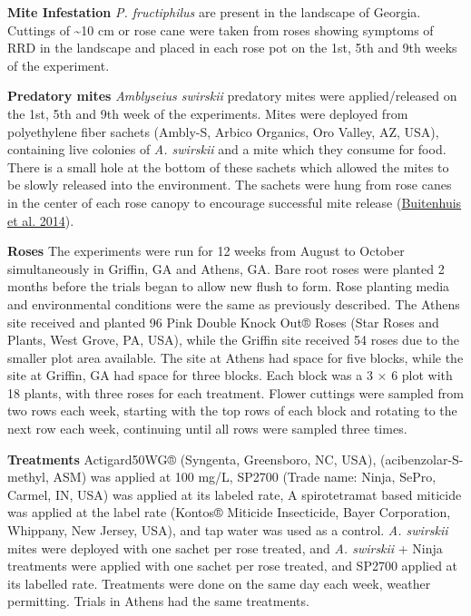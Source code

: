 \documentclass[12pt,final,CPage]{ufthesis}
\begin{document}
{  \textbf{Mite Infestation}
  \emph{P. fructiphilus} are present in the landscape of Georgia. Cuttings of \textasciitilde10 cm or rose cane were taken from roses showing symptoms of RRD in the landscape and placed in each rose pot on the 1st, 5th and 9th weeks of the experiment.

  \textbf{Predatory mites}
  \emph{Amblyseius swirskii} predatory mites were applied/released on the 1st, 5th and 9th week of the experiments. Mites were deployed from polyethylene fiber sachets (Ambly-S, Arbico Organics, Oro Valley, AZ, USA), containing live colonies of \emph{A. swirskii} and a mite which they consume for food. There is a small hole at the bottom of these sachets which allowed the mites to be slowly released into the environment. The sachets were hung from rose canes in the center of each rose canopy to encourage successful mite release (\protect\hyperlink{ref-Buitenhuis2014}{Buitenhuis et al. 2014}).

  \textbf{Roses}
  The experiments were run for 12 weeks from August to October simultaneously in Griffin, GA and Athens, GA. Bare root roses were planted 2 months before the trials began to allow new flush to form. Rose planting media and environmental conditions were the same as previously described. The Athens site received and planted 96 Pink Double Knock Out® Roses (Star Roses and Plants, West Grove, PA, USA), while the Griffin site received 54 roses due to the smaller plot area available. The site at Athens had space for five blocks, while the site at Griffin, GA had space for three blocks. Each block was a 3 \(\times\) 6 plot with 18 plants, with three roses for each treatment. Flower cuttings were sampled from two rows each week, starting with the top rows of each block and rotating to the next row each week, continuing until all rows were sampled three times.

  \textbf{Treatments}
  Actigard50WG® (Syngenta, Greensboro, NC, USA), (acibenzolar-S-methyl, ASM) was applied at 100 \si{\milli\gram}/\si{\liter}, SP2700 (Trade name: Ninja\texttrademark, SePro, Carmel, IN, USA) was applied at its labeled rate, A spirotetramat based miticide was applied at the label rate (Kontos® Miticide Insecticide, Bayer Corporation, Whippany, New Jersey, USA), and tap water was used as a control. \emph{A. swirskii} mites were deployed with one sachet per rose treated, and \emph{A. swirskii} + Ninja treatments were applied with one sachet per rose treated, and SP2700 applied at its labelled rate. Treatments were done on the same day each week, weather permitting. Trials in Athens had the same treatments.

}
\end{document}
